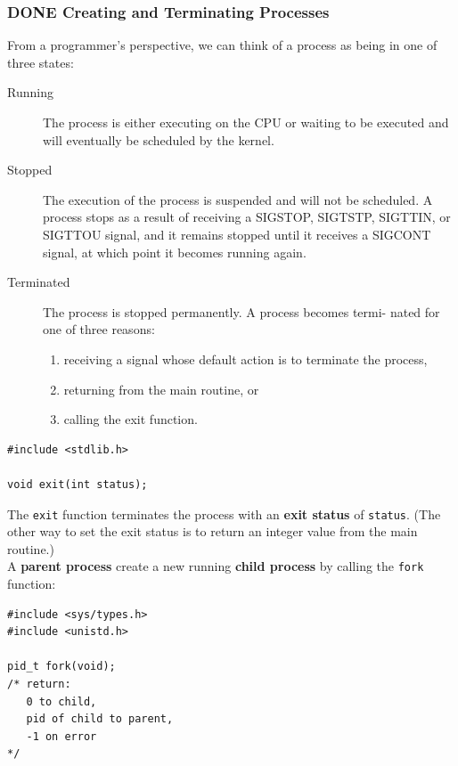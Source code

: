 \documentclass[11pt]{article}
\begin{document}
\subsubsection{{\bfseries\sffamily DONE} Creating and Terminating Processes}
\label{sec:org4c94d9c}
From a programmer’s perspective, we can think of a process as being in one of three states:\\
\begin{description}
\item[{Running}] The process is either executing on the CPU or waiting to be executed and will eventually be scheduled by the kernel.\\
\item[{Stopped}] The execution of the process is suspended and will not be scheduled. A process stops as a result of receiving a SIGSTOP, SIGTSTP, SIGTTIN, or SIGTTOU signal, and it remains stopped until it receives a SIGCONT signal, at which point it becomes running again.\\
\item[{Terminated}] The process is stopped permanently. A process becomes termi- nated for one of three reasons:\\
\begin{enumerate}
\item receiving a signal whose default action is to terminate the process,\\
\item returning from the main routine, or\\
\item calling the exit function.\\
\end{enumerate}
\end{description}


\begin{verbatim}
#include <stdlib.h>

void exit(int status);
\end{verbatim}
The \texttt{exit} function terminates the process with an \textbf{exit status} of \texttt{status}. (The other way to set the exit status is to return an integer value from the main routine.)\\


A \textbf{parent process} create a new running \textbf{child process} by calling the \texttt{fork} function:\\
\begin{verbatim}
#include <sys/types.h>
#include <unistd.h>

pid_t fork(void);
/* return:
   0 to child,
   pid of child to parent,
   -1 on error
*/
\end{verbatim}
\end{document}
